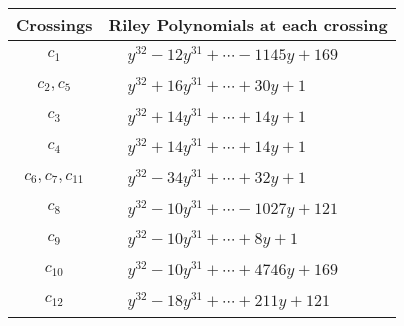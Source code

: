 \documentclass[1p]{elsarticle_modified}
\theoremstyle{definition}
\begin{document}
\begin{tabular}{m{50pt}|m{274pt}}
Crossings & \hspace{64pt}Riley Polynomials at each crossing \\
\hline $$\begin{aligned}c_{1}\end{aligned}$$&$\begin{aligned}
&y^{32}-12 y^{31}+\cdots-1145 y+169
\end{aligned}$\\
\hline $$\begin{aligned}c_{2},c_{5}\end{aligned}$$&$\begin{aligned}
&y^{32}+16 y^{31}+\cdots+30 y+1
\end{aligned}$\\
\hline $$\begin{aligned}c_{3}\end{aligned}$$&$\begin{aligned}
&y^{32}+14 y^{31}+\cdots+14 y+1
\end{aligned}$\\
\hline $$\begin{aligned}c_{4}\end{aligned}$$&$\begin{aligned}
&y^{32}+14 y^{31}+\cdots+14 y+1
\end{aligned}$\\
\hline $$\begin{aligned}c_{6},c_{7},c_{11}\end{aligned}$$&$\begin{aligned}
&y^{32}-34 y^{31}+\cdots+32 y+1
\end{aligned}$\\
\hline $$\begin{aligned}c_{8}\end{aligned}$$&$\begin{aligned}
&y^{32}-10 y^{31}+\cdots-1027 y+121
\end{aligned}$\\
\hline $$\begin{aligned}c_{9}\end{aligned}$$&$\begin{aligned}
&y^{32}-10 y^{31}+\cdots+8 y+1
\end{aligned}$\\
\hline $$\begin{aligned}c_{10}\end{aligned}$$&$\begin{aligned}
&y^{32}-10 y^{31}+\cdots+4746 y+169
\end{aligned}$\\
\hline $$\begin{aligned}c_{12}\end{aligned}$$&$\begin{aligned}
&y^{32}-18 y^{31}+\cdots+211 y+121
\end{aligned}$\\
\hline
\end{tabular}\\~\\
\end{document}
